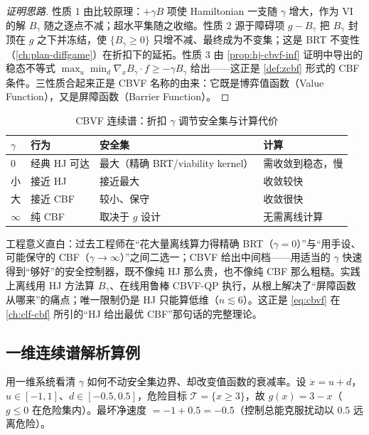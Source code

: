 \begin{proof}[证明思路]
性质 1 由比较原理：$+\gamma B$ 项使 Hamiltonian 一支随 $\gamma$ 增大，作为 VI 的解 $B_\gamma$ 随之逐点不减；超水平集随之收缩。性质 2 源于障碍项 $g-B_\gamma$ 把 $B_\gamma$ 封顶在 $g$ 之下并冻结，使 $\{B_\gamma\ge0\}$ 只增不减、最终成为不变集；这是 BRT 不变性（\cref{ch:plan-diffgame}）在折扣下的延拓。性质 3 由 \cref{prop:hj-cbvf-inf} 证明中导出的稳态不等式 $\max_u\min_d\nabla_xB_\gamma\cdot f\ge-\gamma B_\gamma$ 给出——这正是 \cref{def:zcbf} 形式的 CBF 条件。三性质合起来正是 CBVF 名称的由来：它既是博弈值函数（Value Function），又是屏障函数（Barrier Function）。
\end{proof}

\begin{table}[H]\centering\small
\caption{CBVF 连续谱：折扣 $\gamma$ 调节安全集与计算代价}
\label{tab:hj-cbvf-spectrum}
\begin{tabular}{llll}
\toprule
$\gamma$ & 行为 & 安全集 & 计算 \\
\midrule
$0$ & 经典 HJ 可达 & 最大（精确 BRT/viability kernel） & 需收敛到稳态，慢 \\
小 & 接近 HJ & 接近最大 & 收敛较快 \\
大 & 接近 CBF & 较小、保守 & 收敛很快 \\
$\infty$ & 纯 CBF & 取决于 $g$ 设计 & 无需离线计算 \\
\bottomrule
\end{tabular}
\end{table}

\begin{remark}
工程意义直白：过去工程师在“花大量离线算力得精确 BRT（$\gamma=0$）”与“用手设、可能保守的 CBF（$\gamma\to\infty$）”之间二选一；CBVF 给出中间档——用适当的 $\gamma$ 快速得到“够好”的安全控制器，既不像纯 HJ 那么贵，也不像纯 CBF 那么粗糙。实践上离线用 HJ 方法算 $B_\gamma$、在线用鲁棒 CBVF-QP 执行，从根上解决了“屏障函数从哪来”的痛点；唯一限制仍是 HJ 只能算低维（$n\lesssim6$）。这正是 \cref{eq:cbvf} 在 \cref{ch:clf-cbf} 所引的“HJ 给出最优 CBF”那句话的完整理论。
\end{remark}

\subsection{一维连续谱解析算例}
\label{sec:hj-cbvf-1d}

用一维系统看清 $\gamma$ 如何不动安全集边界、却改变值函数的衰减率。设 $\dot x=u+d$，$u\in[-1,1]$、$d\in[-0.5,0.5]$，危险目标 $\mathcal T=\{x\ge3\}$，故 $g(x)=3-x$（$g\le0$ 在危险集内）。最坏净速度 $=-1+0.5=-0.5$（控制总能克服扰动以 $0.5$ 远离危险）。

